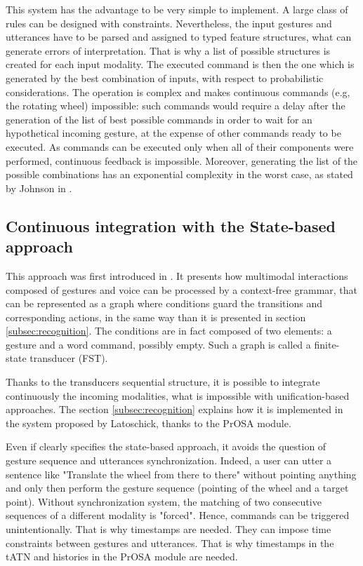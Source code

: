 \documentclass[a4paper]{article}
\begin{document}
This system has the advantage to be very simple to implement. A large class of rules can be designed with constraints. Nevertheless, the input gestures and utterances have to be parsed and assigned to typed feature structures, what can generate errors of interpretation. That is why a list of possible structures is created for each input modality. The executed command is then the one which is generated by the best combination of inputs, with respect to probabilistic considerations. The operation is complex and makes continuous commands (e.g, the rotating wheel) impossible: such commands would require a delay after the generation of the list of best possible commands in order to wait for an hypothetical incoming gesture, at the expense of other commands ready to be executed. As commands can be executed only when all of their components were performed, continuous feedback is impossible. Moreover, generating the list of the possible combinations has an exponential complexity in the worst case, as stated by Johnson in \cite{state-based}.

\subsection{Continuous integration with the State-based approach}
This approach was first introduced in \cite{state-based}. It presents how multimodal interactions composed of gestures and voice can be processed by a context-free grammar, that can be represented as a graph where conditions guard the transitions and corresponding actions, in the same way than it is presented in section \ref{subsec:recognition}. The conditions are in fact composed of two elements: a gesture and a word command, possibly empty. Such a graph is called a finite-state transducer (FST).

Thanks to the transducers sequential structure, it is possible to integrate continuously the incoming modalities, what is impossible with unification-based approaches. The section \ref{subsec:recognition} explains how it is implemented in the system proposed by Latoschick, thanks to the PrOSA module.

Even if \cite{state-based} clearly specifies the state-based approach, it avoids the question of gesture sequence and utterances synchronization. Indeed, a user can utter a sentence like "Translate the wheel from there to there" without pointing anything and only then perform the gesture sequence (pointing of the wheel and a target point). Without synchronization system, the matching of two consecutive sequences of a different modality is "forced". Hence, commands can be triggered unintentionally. That is why timestamps are needed. They can impose time constraints between gestures and utterances. That is why timestamps in the tATN and histories in the PrOSA module are needed.
\end{document}
